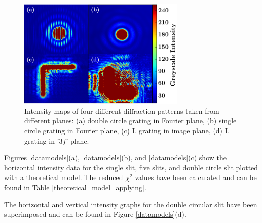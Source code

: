\documentclass[twocolumn]{revtex4}
\begin{document}
\begin{figure}[!h]
\begin{center}
\includegraphics[width=8cm]{results/collage3}
\caption[]{Intensity maps of four different diffraction patterns taken from different planes: (a) double circle grating in Fourier plane, (b) single circle grating in Fourier plane, (c) L grating in image plane, (d) L grating in '$3f$' plane.}
\label{collage}
\end{center}
\end{figure}

Figures \ref{datamodels}(a), \ref{datamodels}(b), and \ref{datamodels}(c) show the horizontal intensity data for the single slit, five slits, and double circle slit plotted with a theoretical model. The reduced $\chi^2$ values have been calculated and can be found in Table \ref{theoretical_model_applying}.

The horizontal and vertical intensity graphs for the double circular slit have been superimposed and can be found in Figure \ref{datamodels}(d).
\end{document}

